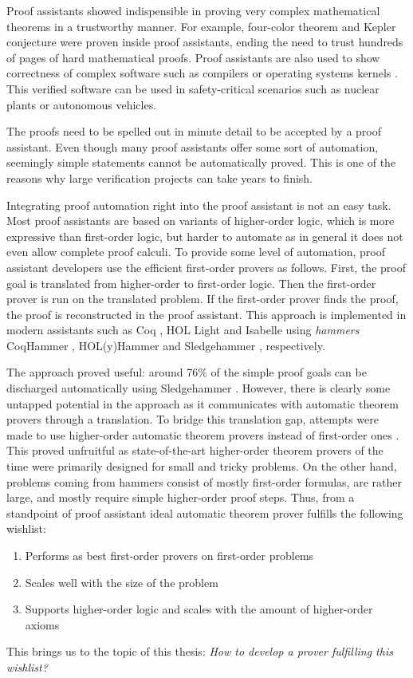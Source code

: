 Proof assistants showed indispensible in proving very complex mathematical theorems in a
trustworthy manner. For example, four-color theorem \cite{gg-2008-four-color}
and Kepler conjecture \cite{th-2015-kepler} were proven inside proof assistants,
ending the need to trust hundreds of pages of hard mathematical proofs. Proof
assistants are also used to show correctness of complex software such as
compilers \cite{xl-09-compcert} or operating systems kernels \cite{gk-09-sel4}.
This verified software can be used in safety-critical scenarios such as nuclear
plants or autonomous vehicles.

The proofs need to be spelled out in minute detail to be accepted by a proof assistant.
Even though many proof assistants offer some sort of automation, seemingly simple
statements cannot be automatically proved. This is one of the reasons why large
verification projects can take years to finish.

Integrating proof automation right into the proof assistant is not an easy task.
Most proof assistants are based on variants of higher-order logic, which is more
expressive than first-order logic, but harder to automate as in general it does not even allow complete
proof calculi. To provide some level of automation, proof assistant developers
use the efficient first-order provers as follows. First, the proof goal is
translated from higher-order to first-order logic. Then the first-order prover
is run on the translated problem. If the first-order prover finds the proof, the
proof is reconstructed in the proof assistant. This approach is implemented in
modern assistants such as Coq \cite{bc-04-coq}, HOL Light \cite{jh-09-hol-light}
and Isabelle \cite{lc-88-isabelle} using \emph{hammers} CoqHammer
\cite{ck-18-coqhammer}, HOL(y)Hammer \cite{ku-15-holyhammer} and Sledgehammer
\cite{bn-10-sh}, respectively. 

The approach proved useful: around 76\% of the simple proof goals can be
discharged automatically using Sledgehammer \cite{bgkku-16-larning-fact-selector}. However, there is
clearly some untapped potential in the approach as it communicates with
automatic theorem provers through a translation. To bridge this translation gap,
attempts were made to use higher-order automatic theorem provers instead of
first-order ones \cite{ns-13-leo2sh}. This proved unfruitful as state-of-the-art
higher-order theorem provers of the time were primarily designed for small and
tricky problems. On the other hand, problems coming from hammers consist of
mostly first-order formulas, are rather large, and mostly require simple
higher-order proof steps. Thus, from a standpoint of proof assistant ideal
automatic theorem prover fulfills the following wishlist:
\begin{enumerate}
  \item\label{it:fo} Performs as best first-order provers on first-order problems
  \item\label{it:size} Scales well with the size of the problem
  \item\label{it:ho} Supports higher-order logic and scales with the amount of higher-order axioms
\end{enumerate}
This brings us to the topic of this thesis: \emph{How to develop a prover fulfilling this wishlist?}

